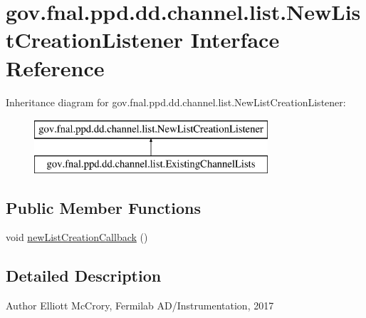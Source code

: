 \hypertarget{interfacegov_1_1fnal_1_1ppd_1_1dd_1_1channel_1_1list_1_1NewListCreationListener}{\section{gov.\-fnal.\-ppd.\-dd.\-channel.\-list.\-New\-List\-Creation\-Listener Interface Reference}
\label{interfacegov_1_1fnal_1_1ppd_1_1dd_1_1channel_1_1list_1_1NewListCreationListener}
}
Inheritance diagram for gov.\-fnal.\-ppd.\-dd.\-channel.\-list.\-New\-List\-Creation\-Listener\-:\begin{figure}[H]
\begin{center}
\leavevmode
\includegraphics[height=2.000000cm]{interfacegov_1_1fnal_1_1ppd_1_1dd_1_1channel_1_1list_1_1NewListCreationListener}
\end{center}
\end{figure}
\subsection*{Public Member Functions}
\begin{DoxyCompactItemize}
\item 
void \hyperlink{interfacegov_1_1fnal_1_1ppd_1_1dd_1_1channel_1_1list_1_1NewListCreationListener_a453407f350d9eacded942c7336dd97c5}{new\-List\-Creation\-Callback} ()
\end{DoxyCompactItemize}


\subsection{Detailed Description}
\begin{DoxyAuthor}{Author}
Elliott Mc\-Crory, Fermilab A\-D/\-Instrumentation, 2017 
\end{DoxyAuthor}



